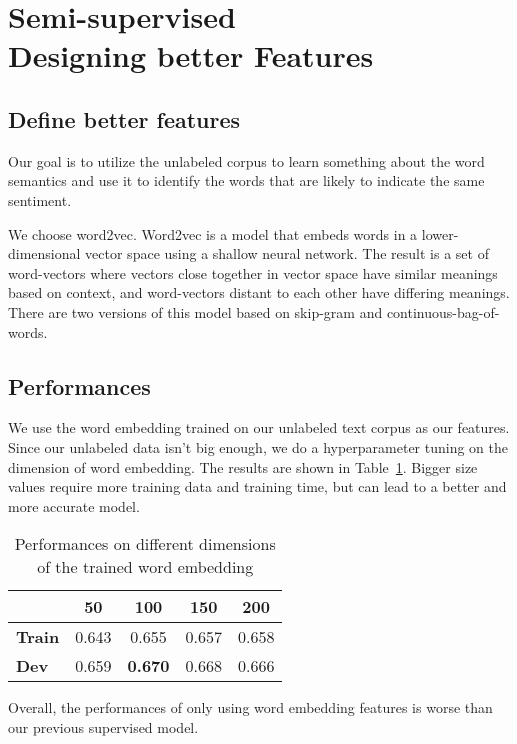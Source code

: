 \section{\textbf{Semi-supervised\\ Designing better Features}}

\subsection{\textbf{Define better features}}

Our goal is to utilize the unlabeled corpus to learn something about the word semantics and use it to identify the words that are likely to indicate the same sentiment.

We choose word2vec. Word2vec is a model that embeds words in a lower-dimensional vector space using a shallow neural network. The result is a set of word-vectors where vectors close together in vector space have similar meanings based on context, and word-vectors distant to each other have differing meanings. There are two versions of this model based on skip-gram and continuous-bag-of-words. 

\subsection{\textbf{Performances}}

We use the word embedding trained on our unlabeled text corpus as our features. Since our unlabeled data isn't big enough, we do a hyperparameter tuning on the dimension of word embedding. The results are shown in Table~\ref{tab:dimen}. Bigger size values require more training data and training time, but can lead to a better and more accurate model.

\begin{table}[ht]  %
\centering  %
\caption{Performances on different dimensions of the trained word embedding}
\begin{tabular}{lcccc}
\hline
&    \textbf{50} & \textbf{100} & \textbf{150} & \textbf{200} \\
\hline
 \textbf{Train} & 0.643 & 0.655 & 0.657 & 0.658\\
 \textbf{Dev}   & 0.659 & \textbf{0.670} & 0.668 & 0.666\\
\hline
\end{tabular}
\label{tab:dimen}
\end{table}

Overall, the performances of only using word embedding features is worse than our previous supervised model.